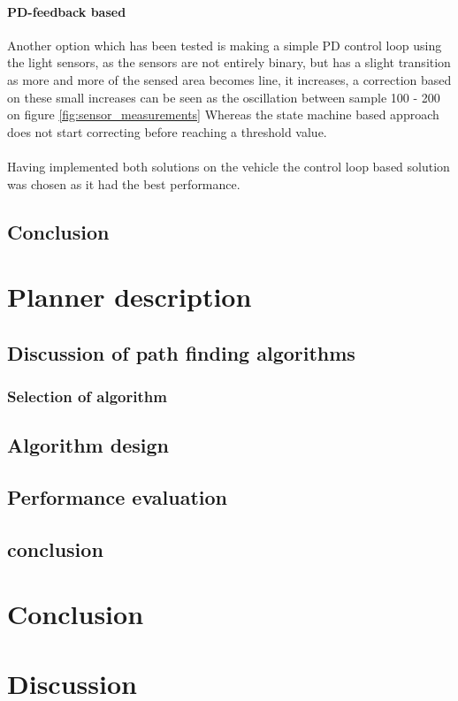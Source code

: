 \documentclass[draft, english, a4paper, 10pt]{article}
\begin{document}
            \paragraph{PD-feedback based}
            Another option which has been tested is making a simple PD control loop
            using the light sensors, as the sensors are not entirely binary,
            but has a slight transition as more and more of the sensed area becomes
            line, it increases, a correction based on these small increases can 
            be seen as the oscillation between sample 100 - 200 on figure \ref{fig:sensor_measurements}
            Whereas the state machine based approach does not start correcting before reaching a threshold value.\\
            \\
            Having implemented both solutions on the vehicle the control loop based
            solution was chosen as it had the best performance.
	\subsection{Conclusion} %
\section{Planner description}
    
	\subsection{Discussion of path finding algorithms} %
		\subsubsection{Selection of algorithm}
	\subsection{Algorithm design}
	\subsection{Performance evaluation}
	\subsection{conclusion}
\section{Conclusion}
\section{Discussion}


\appendix
\end{document}

